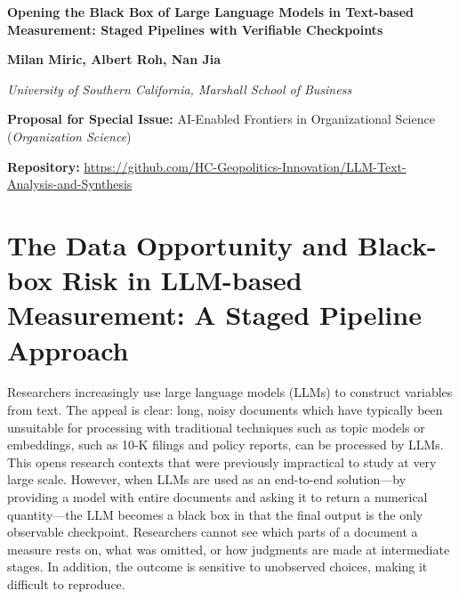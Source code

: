 \documentclass[11pt]{article}
\begin{document}
\begin{center}
    {\Large\bfseries Opening the Black Box of Large Language Models in Text-based Measurement: Staged Pipelines with Verifiable Checkpoints\par}
    \vspace{1em}
    {\normalsize\bfseries Milan Miric, Albert Roh, Nan Jia\par}
    \vspace{0.2em}
    {\small\itshape University of Southern California, Marshall School of Business\par}
    \vspace{0.8em}
    {\footnotesize\textbf{Proposal for Special Issue:} AI-Enabled Frontiers in Organizational Science (\textit{Organization Science})\par}
    \vspace{0.3em}
    {\footnotesize\textbf{Repository:} \url{https://github.com/HC-Geopolitics-Innovation/LLM-Text-Analysis-and-Synthesis}\par}
\end{center}

\vspace{1.5em}

\section{The Data Opportunity and Black-box Risk in LLM-based Measurement: A Staged Pipeline Approach}

Researchers increasingly use large language models (LLMs) to construct variables from text. The appeal is clear: long, noisy documents which have typically been unsuitable for processing with traditional techniques such as topic models or embeddings, such as 10-K filings and policy reports, can be processed by LLMs. This opens research contexts that were previously impractical to study at very large scale. However, when LLMs are used as an end-to-end solution---by providing a model with entire documents and asking it to return a numerical quantity---the LLM becomes a black box in that the final output is the only observable checkpoint. Researchers cannot see which parts of a document a measure rests on, what was omitted, or how judgments are made at intermediate stages. In addition, the outcome is sensitive to unobserved choices, making it difficult to reproduce.
\end{document}
